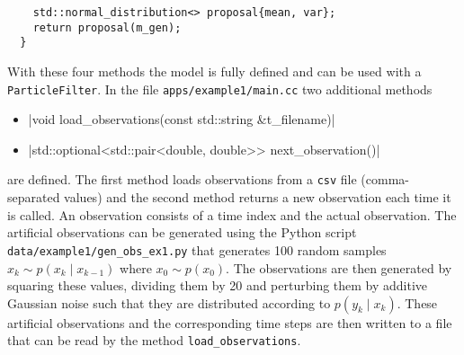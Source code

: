 \begin{example}
\begin{verbatim}
    std::normal_distribution<> proposal{mean, var};
    return proposal(m_gen);
  }
\end{verbatim}
  With these four methods the model is fully defined and can be used
  with a \texttt{ParticleFilter}. In the file
  \texttt{apps/example1/main.cc} two additional methods
  \begin{itemize}
  \item {}|void load_observations(const std::string
    &t_filename)|
  \item {}|std::optional<std::pair<double, double>>
    next_observation()|
  \end{itemize}
  are defined. The first method loads observations from a \texttt{csv}
  file (comma-separated values) and the second method returns a new
  observation each time it is called. An observation consists of a
  time index and the actual observation. The artificial observations
  can be generated using the Python script
  \texttt{data/example1/gen\_obs\_ex1.py} that generates 100 random
  samples $x_k \sim p(x_k \mid x_{k-1})$ where $x_0 \sim p(x_0)$. The
  observations are then generated by squaring these values, dividing
  them by 20 and perturbing them by additive Gaussian noise such that
  they are distributed according to $p(y_k \mid x_k)$. These
  artificial observations and the corresponding time steps are then
  written to a file that can be read by the method
  \texttt{load\_observations}.
\end{example}



























\begin{example}\label{ex:lv1}
\end{example}

\begin{example}\label{ex:lv2}
  
\end{example}

 